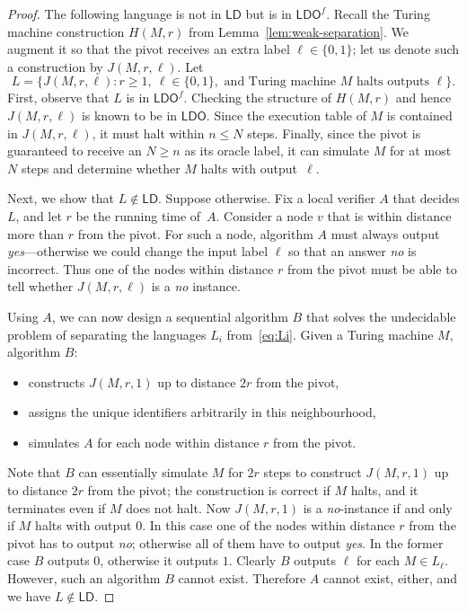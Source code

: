 \documentclass[11pt,a4paper]{article}
\theoremstyle{definition}
\theoremstyle{remark}
\newcommand{\ldo}{\mathsf{LDO}}
\newcommand{\ld}{\mathsf{LD}}
\begin{document}
\begin{proof}
  The following language is not in $\ld$ but is in $\ldo^f$. Recall the Turing machine construction $H(M,r)$ from Lemma~\ref{lem:weak-separation}. We augment it so that the pivot receives an extra label $\ell \in \{0,1\}$; let us denote such a construction by $J(M,r,\ell)$. Let
    \[
        L = \{ J(M,r,\ell) : r \ge 1,\ \ell \in \{0,1\}, \text{ and Turing machine } M \text{ halts outputs } \ell \}.
    \]
    First, observe that $L$ is in $\ldo^f$. Checking the structure of $H(M,r)$ and hence $J(M,r,\ell)$ is known to be in $\ldo$. Since the execution table of $M$ is contained in $J(M,r,\ell)$, it must halt within $n \le N$ steps. Finally, since the pivot is guaranteed to receive an $N\ge n$ as its oracle label, it can simulate $M$ for at most $N$ steps and determine whether $M$ halts with output~$\ell$.

    Next, we show that $L \notin \ld$. Suppose otherwise. Fix a local verifier $A$ that decides $L$, and let $r$ be the running time of~$A$. Consider a node $v$ that is within distance more than $r$ from the pivot. For such a node, algorithm $A$ must always output \emph{yes}---otherwise we could change the input label $\ell$ so that an answer \emph{no} is incorrect. Thus one of the nodes within distance $r$ from the pivot must be able to tell whether $J(M,r,\ell)$ is a \emph{no} instance.

    Using $A$, we can now design a sequential algorithm $B$ that solves the undecidable problem of separating the languages $L_i$ from~\eqref{eq:Li}. Given a Turing machine $M$, algorithm $B$:
    \begin{itemize}[noitemsep]
        \item constructs $J(M,r,1)$ up to distance $2r$ from the pivot,
        \item assigns the unique identifiers arbitrarily in this neighbourhood,
        \item simulates $A$ for each node within distance $r$ from the pivot.
    \end{itemize}
    Note that $B$ can essentially simulate $M$ for $2r$ steps to construct $J(M,r,1)$ up to distance $2r$ from the pivot; the construction is correct if $M$ halts, and it terminates even if $M$ does not halt. Now $J(M,r,1)$ is a \emph{no}-instance if and only if $M$ halts with output $0$. In this case one of the nodes within distance $r$ from the pivot has to output \emph{no}; otherwise all of them have to output \emph{yes}. In the former case $B$ outputs $0$, otherwise it outputs $1$. Clearly $B$ outputs $\ell$ for each $M \in L_\ell$. However, such an algorithm $B$ cannot exist. Therefore $A$ cannot exist, either, and we have $L \notin \ld$. \qedhere
\end{proof}
\end{document}
